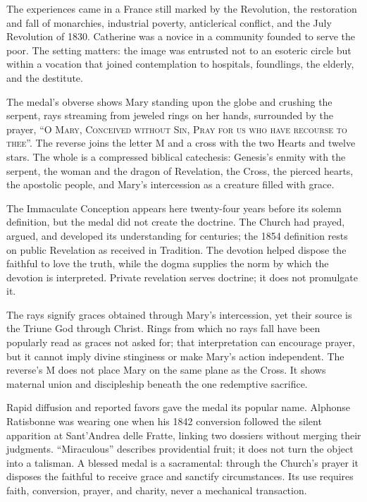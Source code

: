 The experiences came in a France still marked by the Revolution, the restoration and fall of monarchies, industrial poverty, anticlerical conflict, and the July Revolution of 1830. Catherine was a novice in a community founded to serve the poor. The setting matters: the image was entrusted not to an esoteric circle but within a vocation that joined contemplation to hospitals, foundlings, the elderly, and the destitute.

The medal's obverse shows Mary standing upon the globe and crushing the serpent, rays streaming from jeweled rings on her hands, surrounded by the prayer, ``\textsc{O Mary, Conceived without Sin, Pray for us who have recourse to thee}''. The reverse joins the letter M and a cross with the two Hearts and twelve stars. The whole is a compressed biblical catechesis: Genesis's enmity with the serpent, the woman and the dragon of Revelation, the Cross, the pierced hearts, the apostolic people, and Mary's intercession as a creature filled with grace.

The Immaculate Conception appears here twenty-four years before its solemn definition, but the medal did not create the doctrine. The Church had prayed, argued, and developed its understanding for centuries; the 1854 definition rests on public Revelation as received in Tradition. The devotion helped dispose the faithful to love the truth, while the dogma supplies the norm by which the devotion is interpreted. Private revelation serves doctrine; it does not promulgate it.

The rays signify graces obtained through Mary's intercession, yet their source is the Triune God through Christ. Rings from which no rays fall have been popularly read as graces not asked for; that interpretation can encourage prayer, but it cannot imply divine stinginess or make Mary's action independent. The reverse's M does not place Mary on the same plane as the Cross. It shows maternal union and discipleship beneath the one redemptive sacrifice.

Rapid diffusion and reported favors gave the medal its popular name. Alphonse Ratisbonne was wearing one when his 1842 conversion followed the silent apparition at Sant'Andrea delle Fratte, linking two dossiers without merging their judgments. ``Miraculous'' describes providential fruit; it does not turn the object into a talisman. A blessed medal is a sacramental: through the Church's prayer it disposes the faithful to receive grace and sanctify circumstances. Its use requires faith, conversion, prayer, and charity, never a mechanical transaction.

